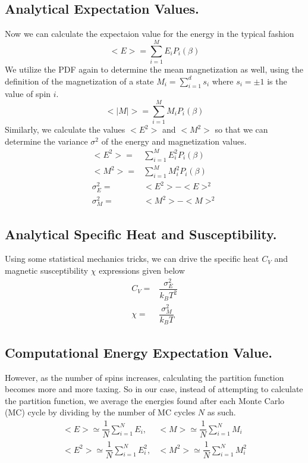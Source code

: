 \documentclass[a4paper]{article}
\begin{document}
\subsection{Analytical Expectation Values.}
Now we can calculate the expectaion value for the energy in the typical fashion
\begin{equation}\label{eq:expece}
<E> = \sum_{i=1}^ME_iP_i(\beta)
\end{equation} 
We utilize the PDF again to determine the mean magnetization as well, using the definition of the magnetization of a state $M_i = \sum_{i=1}^ds_i$ where $s_i = \pm 1$ is the value of spin $i$.
\begin{equation}\label{eq:expecm}
<|M|> = \sum_{i=1}^MM_iP_i(\beta)
\end{equation}
Similarly, we calculate the values $<E^2>$ and $<M^2>$ so that we can determine the variance $\sigma^2$ of the energy and magnetization values.
\begin{align*}
<E^2> =& \sum_{i=1}^ME_i^2P_i(\beta)\\
<M^2> =& \sum_{i=1}^MM_i^2P_i(\beta)\\
\sigma_E^2 =& <E^2>-<E>^2\\
\sigma_M^2 =& <M^2>-<M>^2
\end{align*}

\subsection{Analytical Specific Heat and Susceptibility.}
Using some statistical mechanics tricks, we can drive the specific heat $C_V$ and magnetic susceptibility $\chi$ expressions given below
\begin{align}
C_V =& \dfrac{\sigma_E^2}{k_BT^2}\\
\chi =& \dfrac{\sigma_M^2}{k_BT} 
\end{align}

\subsection{Computational Energy Expectation Value.}
However, as the number of spins increases, calculating the partition function becomes more and more taxing. So in our case, instead of attempting to calculate the partition function, we average the energies found after each Monte Carlo (MC) cycle by dividing by the number of MC cycles $N$ as such. 
\begin{align}
<E> \simeq \dfrac{1}{N}\sum_{i=1}^N E_i, & <M> \simeq \dfrac{1}{N}\sum_{i=1}^N M_i\\
<E^2> \simeq \dfrac{1}{N}\sum_{i=1}^N E_i^2, & <M^2> \simeq \dfrac{1}{N}\sum_{i=1}^N M_i^2
\end{align}
\end{document}
